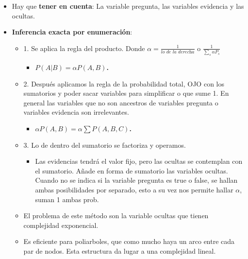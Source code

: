 \documentclass[12pt, twoside, openright]{report} %
\begin{document}
  \begin{itemize}
  \item Hay que \textbf{tener en cuenta}: La variable pregunta, las
    variables evidencia y las ocultas.
    \pagebreak
  \item \textbf{Inferencia exacta por enumeración}:
    

    \begin{itemize}
    \item 1. Se aplica la regla del producto. Donde $\alpha=\frac{1}{\textit{lo de la derecha}}$ o
      $\frac{1}{\sum\limits_s \alpha P_s} $
      

      \begin{itemize}
      \item \textbf{$P(A| B)=\alpha P(A, B)$.}
        
      \end{itemize}
    \item 2. Después aplicamos la regla de la probabilidad total, OJO con
      los sumatorios y poder sacar variables para simplificar o que sume
      1. En general las variables que no son ancestros de variables
      pregunta o variables evidencia son irrelevantes.
      

      \begin{itemize}
      \item \textbf{$\alpha P(A,B)=\alpha \sum\limits P(A, B, C)$.}
        
      \end{itemize}
    \item 3. Lo de dentro del sumatorio se factoriza y operamos.
      

      \begin{itemize}
      \item Las evidencias tendrá el valor fijo, pero las ocultas se
        contemplan con el sumatorio. Añade en forma de sumatorio las
        variables ocultas. Cuando no se indica si la variable pregunta
        es true o false, se hallan ambas posibilidades por separado,
        esto a su vez nos permite hallar $\alpha$, suman 1 ambas prob.
        
      \end{itemize}
    \item El problema de este método son la variable ocultas que tienen
      complejidad exponencial.
      
    \item Es eficiente para poliarboles, que como mucho haya un arco entre
      cada par de nodos. Esta estructura da lugar a una complejidad
      lineal.
      

\end{itemize}
\end{itemize}
\end{document}
